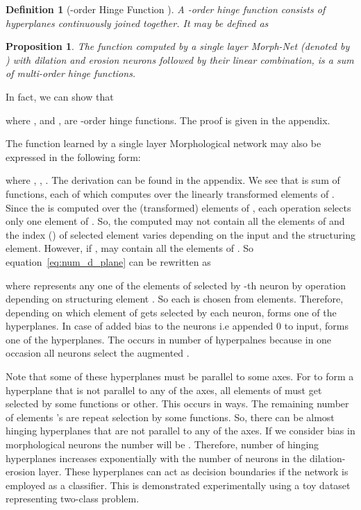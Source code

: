\documentclass[12pt]{article}
\def\eqref#1{equation~\ref{#1}}
\newtheorem{proposition}{Proposition}
\newtheorem{definition}{Definition}
\begin{document}
\begin{definition}[-order Hinge Function \cite{wang2005generalization}]
    A -order hinge function  consists of  hyperplanes continuously joined together. It may be defined as 
    
\end{definition}

\begin{proposition}
\label{th:gx_sum_hinge}
The function computed by a single layer Morph-Net (denoted by ) with  dilation and  erosion neurons followed by their linear combination, is a sum of multi-order hinge functions.
\end{proposition}
\noindent In fact, we can show that 

where ,  and , are -order hinge functions. The proof is given in the appendix.

The function  learned by a single layer Morphological network may also be expressed in the following form:

where , , . 
The derivation can be found in the appendix. 
We see that  is sum of  functions, each of which computes  over the linearly transformed elements of . Since the  is computed over the (transformed) elements of , each  operation selects only one element of . So, the computed  may not contain all the elements of  and the index () of selected element varies depending on the input and the structuring element. However, if ,  may contain all the elements of . So \eqref{eq:num_d_plane} can be rewritten as 

where  represents any one of the  elements of  selected by -th neuron by  operation depending on structuring element . So each  is chosen from  elements. Therefore, depending on which element of  gets selected by each neuron,  forms one of the  hyperplanes. 
In case of added bias to the neurons i.e appended 0 to input,  forms one of the  hyperplanes. The  occurs in number of hyperpalnes because in one occasion  all neurons select the augmented . 

Note that some of these hyperplanes must be parallel to some axes. 
For  to form a hyperplane that is not parallel to any of the axes, all elements of  must get selected by some  functions or other. This occurs in  ways. The remaining  number of elements 's are repeat selection by some functions. So, there can be almost  hinging hyperplanes that are not parallel to any of the axes. If we consider bias in morphological neurons the number will be . Therefore, number of hinging hyperplanes increases exponentially with the number of neurons in the dilation-erosion layer. These hyperplanes can act as decision boundaries if the network is employed as a classifier. This is demonstrated experimentally using a toy dataset representing two-class problem. 
\end{document}
